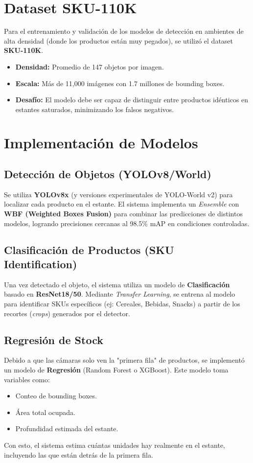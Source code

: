 \documentclass[12pt,a4paper]{article}
\begin{document}
\section{Dataset SKU-110K}
Para el entrenamiento y validación de los modelos de detección en ambientes de alta densidad (donde los productos están muy pegados), se utilizó el dataset \textbf{SKU-110K}. 
\begin{itemize}
    \item \textbf{Densidad:} Promedio de 147 objetos por imagen.
    \item \textbf{Escala:} Más de 11,000 imágenes con 1.7 millones de bounding boxes.
    \item \textbf{Desafío:} El modelo debe ser capaz de distinguir entre productos idénticos en estantes saturados, minimizando los falsos negativos.
\end{itemize}

\section{Implementación de Modelos}

\subsection{Detección de Objetos (YOLOv8/World)}
Se utiliza \textbf{YOLOv8x} (y versiones experimentales de YOLO-World v2) para localizar cada producto en el estante. El sistema implementa un \textit{Ensemble} con \textbf{WBF (Weighted Boxes Fusion)} para combinar las predicciones de distintos modelos, logrando precisiones cercanas al 98.5\% mAP en condiciones controladas.

\subsection{Clasificación de Productos (SKU Identification)}
Una vez detectado el objeto, el sistema utiliza un modelo de \textbf{Clasificación} basado en \textbf{ResNet18/50}. Mediante \textit{Transfer Learning}, se entrena al modelo para identificar SKUs específicos (ej: Cereales, Bebidas, Snacks) a partir de los recortes (\textit{crops}) generados por el detector.

\subsection{Regresión de Stock}
Debido a que las cámaras solo ven la "primera fila" de productos, se implementó un modelo de \textbf{Regresión} (Random Forest o XGBoost). Este modelo toma variables como:
\begin{itemize}
    \item Conteo de bounding boxes.
    \item Área total ocupada.
    \item Profundidad estimada del estante.
\end{itemize}
Con esto, el sistema estima cuántas unidades hay realmente en el estante, incluyendo las que están detrás de la primera fila.
\end{document}
